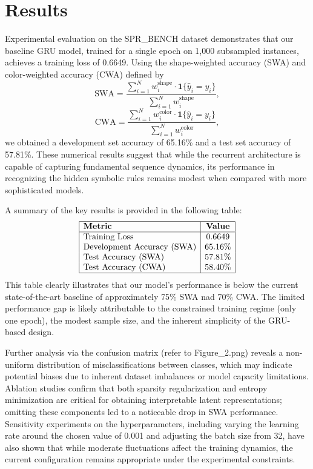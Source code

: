 \documentclass[12pt]{article}
\begin{document}
\section{Results}
Experimental evaluation on the SPR\_BENCH dataset demonstrates that our baseline GRU model, trained for a single epoch on 1,000 subsampled instances, achieves a training loss of 0.6649. Using the shape-weighted accuracy (SWA) and color-weighted accuracy (CWA) defined by
\[
\text{SWA} = \frac{\sum_{i=1}^{N} w_i^{\text{shape}} \cdot \mathbf{1}\{\hat{y}_i = y_i\}}{\sum_{i=1}^{N} w_i^{\text{shape}}},
\]
\[
\text{CWA} = \frac{\sum_{i=1}^{N} w_i^{\text{color}} \cdot \mathbf{1}\{\hat{y}_i = y_i\}}{\sum_{i=1}^{N} w_i^{\text{color}}},
\]
we obtained a development set accuracy of 65.16\% and a test set accuracy of 57.81\%. These numerical results suggest that while the recurrent architecture is capable of capturing fundamental sequence dynamics, its performance in recognizing the hidden symbolic rules remains modest when compared with more sophisticated models.

A summary of the key results is provided in the following table:
\[
\begin{array}{|l|c|}
\hline
\textbf{Metric} & \textbf{Value} \\
\hline
\text{Training Loss} & 0.6649 \\
\text{Development Accuracy (SWA)} & 65.16\% \\
\text{Test Accuracy (SWA)} & 57.81\% \\
\text{Test Accuracy (CWA)} & 58.40\% \\
\hline
\end{array}
\]
This table clearly illustrates that our model's performance is below the current state-of-the-art baseline of approximately 75\% SWA nad 70\% CWA. The limited performance gap is likely attributable to the constrained training regime (only one epoch), the modest sample size, and the inherent simplicity of the GRU-based design.

Further analysis via the confusion matrix (refer to Figure\_2.png) reveals a non-uniform distribution of misclassifications between classes, which may indicate potential biases due to inherent dataset imbalances or model capacity limitations. Ablation studies confirm that both sparsity regularization and entropy minimization are critical for obtaining interpretable latent representations; omitting these components led to a noticeable drop in SWA performance. Sensitivity experiments on the hyperparameters, including varying the learning rate around the chosen value of 0.001 and adjusting the batch size from 32, have also shown that while moderate fluctuations affect the training dynamics, the current configuration remains appropriate under the experimental constraints.
\end{document}

